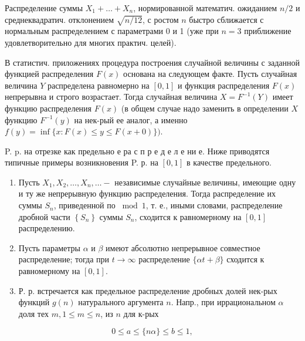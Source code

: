 \documentclass[10pt]{article}
\begin{document}
Распределение суммы $X_{1}+\ldots+X_{n}$, нормированной математич. ожиданием $n / 2$ и среднеквадратич. отклонением $\sqrt{n / 12}$, с ростом $n$ быстро сближается с нормальным распределением с параметрами 0 и 1 (уже при $n=3$ приближение удовлетворительно для многих практич. целей).



В статистич. приложениях процедура построения случайной величины с заданной функцией распределения $F(x)$ основана на следующем факте. Пусть случайная величина $Y$ распределена равномерно на $[0,1]$ и функция распределения $F(x)$ непрерывна и строго возрастает. Тогда случайная величина $X=F^{-1}(Y)$ имеет функцию распределения $F(x)$ (в общем случае надо заменить в определении $X$ функцию $F^{-1}(y)$ на нек-рый ее аналог, а именно $f(y)=\inf \{x: F(x) \leqslant y \leqslant F(x+0)\})$.



P. p. на отрезке как предельно е ра с п р е д е л е ни е. Ниже приводятся типичные примеры возникновения P. р. на $[0,1]$ в качестве предельного.



\begin{enumerate}

  \item Пусть $X_{1}, X_{2}, \ldots, X_{n}, \ldots-$ независимые случайные величины, имеющие одну и ту же непрерывную функцию распределения. Тогда распределение их суммы $S_{n}$, приведенной по $\bmod 1$, т. е., иными словами, распределение дробной части $\left\{S_{n}\right\}$ суммы $S_{n}$, сходится к равномерному на $[0,1]$ распределению.



  \item Пусть параметры $\alpha$ и $\beta$ имеют абсолютно непрерывное совместное распределение; тогда при $t \rightarrow \infty$ распределение $\{\alpha t+\beta\}$ сходится к равномерному на $[0,1]$.



  \item Р. р. встречается как предельное распределение дробных долей нек-рых функций $g(n)$ натурального аргумента $n$. Напр., при иррациональном $\alpha$ доля тех $m, 1 \leqslant m \leqslant n$, из $n$ для к-рых



\end{enumerate}



\[

0 \leqslant a \leqslant\{n \alpha\} \leqslant b \leqslant 1,

\]
\end{document}
